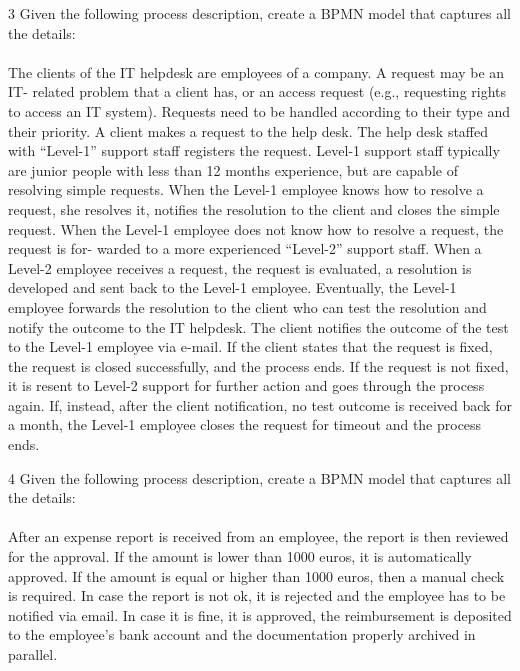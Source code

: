 \begin{exercise}{3}
Given the following process description, create a BPMN model that captures all the details:
\\\\The clients of the IT helpdesk are employees of a company. A request may be an IT-
related problem that a client has, or an access request (e.g., requesting rights to access
an IT system). Requests need to be handled according to their type and their priority.
A client makes a request to the help desk. The help desk staffed with “Level-1” support
staff registers the request. Level-1 support staff typically are junior people with less than
12 months experience, but are capable of resolving simple requests. When the Level-1
employee knows how to resolve a request, she resolves it, notifies the resolution to the
client and closes the simple request.
When the Level-1 employee does not know how to resolve a request, the request is for-
warded to a more experienced “Level-2” support staff. When a Level-2 employee receives
a request, the request is evaluated, a resolution is developed and sent back to the Level-1
employee. Eventually, the Level-1 employee forwards the resolution to the client who
can test the resolution and notify the outcome to the IT helpdesk. The client notifies
the outcome of the test to the Level-1 employee via e-mail. If the client states that the
request is fixed, the request is closed successfully, and the process ends. If the request is
not fixed, it is resent to Level-2 support for further action and goes through the process
again. If, instead, after the client notification, no test outcome is received back for a
month, the Level-1 employee closes the request for timeout and the process ends.
\end{exercise}

\begin{exercise}{4}
Given the following process description, create a BPMN model that captures all the details:
\\\\After an expense report is received from an employee, the report is then reviewed for the approval. 
If the amount is lower than 1000 euros, it is automatically approved. 
If the amount is equal or higher than 1000 euros, then a manual check is required. 
In case the report is not ok, it is rejected and the employee has to be notified via email. 
In case it is fine, it is approved, the reimbursement is deposited to the employee’s bank account and the
documentation properly archived in parallel.
\end{exercise}

